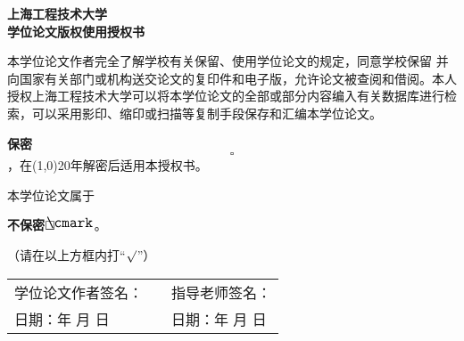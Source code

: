 \newcommand{\checkdone}{\rlap{$\square$}{\raisebox{2pt}{\large\hspace{1pt}\cmark}}\hspace{-2.5pt}}
\newcommand{\checkundone}{$\square$}
\begin{center}
    \heiti\sanhao\textbf{
    上海工程技术大学 \\
    学位论文版权使用授权书}
\end{center}

本学位论文作者完全了解学校有关保留、使用学位论文的规定，同意学校保留
并向国家有关部门或机构送交论文的复印件和电子版，允许论文被查阅和借阅。本人
授权上海工程技术大学可以将本学位论文的全部或部分内容编入有关数据库进行检
索，可以采用影印、缩印或扫描等复制手段保存和汇编本学位论文。

\hspace{8em}\textbf{保密~}$\checkundone$ ，在\line(1,0){20}年解密后适用本授权书。

本学位论文属于

\hspace{8em}\textbf{不保密}$\checkdone$ 。

（请在以上方框内打\quad “\emph{$\surd$}”）

\vspace{15em}
\begin{table}[hbpt]
    \centering
    \renewcommand\arraystretch{1.8}
    \begin{tabular}{p{6cm}<{\raggedright}p{2cm}<{\centering}p{6cm}<{\raggedright}}
        学位论文作者签名：& & 指导老师签名： \\
        日期：\qquad 年 \qquad 月 \qquad 日 & & 日期：\qquad 年 \qquad 月 \qquad 日
    \end{tabular}
\end{table}
\newpage

